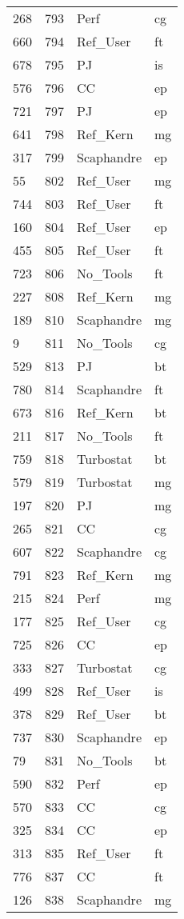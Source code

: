 \begin{tabular}{lrll}
268 & 793 & Perf & cg \\
660 & 794 & Ref_User & ft \\
678 & 795 & PJ & is \\
576 & 796 & CC & ep \\
721 & 797 & PJ & ep \\
641 & 798 & Ref_Kern & mg \\
317 & 799 & Scaphandre & ep \\
55 & 802 & Ref_User & mg \\
744 & 803 & Ref_User & ft \\
160 & 804 & Ref_User & ep \\
455 & 805 & Ref_User & ft \\
723 & 806 & No_Tools & ft \\
227 & 808 & Ref_Kern & mg \\
189 & 810 & Scaphandre & mg \\
9 & 811 & No_Tools & cg \\
529 & 813 & PJ & bt \\
780 & 814 & Scaphandre & ft \\
673 & 816 & Ref_Kern & bt \\
211 & 817 & No_Tools & ft \\
759 & 818 & Turbostat & bt \\
579 & 819 & Turbostat & mg \\
197 & 820 & PJ & mg \\
265 & 821 & CC & cg \\
607 & 822 & Scaphandre & cg \\
791 & 823 & Ref_Kern & mg \\
215 & 824 & Perf & mg \\
177 & 825 & Ref_User & cg \\
725 & 826 & CC & ep \\
333 & 827 & Turbostat & cg \\
499 & 828 & Ref_User & is \\
378 & 829 & Ref_User & bt \\
737 & 830 & Scaphandre & ep \\
79 & 831 & No_Tools & bt \\
590 & 832 & Perf & ep \\
570 & 833 & CC & cg \\
325 & 834 & CC & ep \\
313 & 835 & Ref_User & ft \\
776 & 837 & CC & ft \\
126 & 838 & Scaphandre & mg \\

\end{tabular}
